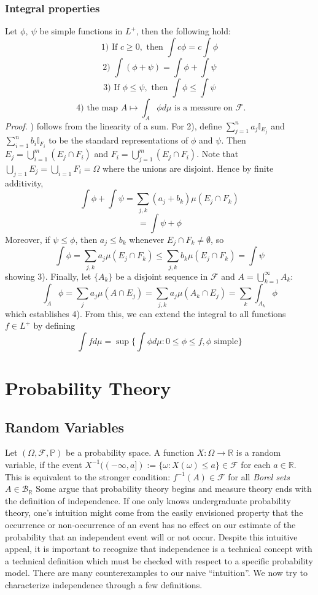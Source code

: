 \documentclass{article}
\begin{document}
\subsubsection{Integral properties}
Let $\phi, \ \psi$ be simple functions in $L^+$, then the following hold:
\[
\text{1) If } c\geq 0, \text{ then } \int c\phi = c\int \phi
\]
\[
\text{2) }\int (\phi+ \psi) = \int \phi+ \int\psi
\]
\[
\text{3) If } \phi \leq \psi, \text{ then } \int \phi \leq \int \psi
\]
\[
\text{ 4) the map } A\mapsto\int_A\phi d\mu \text{ is a measure on } \mathcal{F}.
\]
\textit{Proof.} \newline {}) follows from the linearity of a sum. For 2), define $\sum_{j=1}^na_j\mathbb{I}_{E_j}$ and $\sum_{i=1}^nb_i\mathbb{I}_{F_i}$ to be the standard representations of $\phi$ and $\psi$. 
Then $E_j = \bigcup_{i=1}^m(E_j\cap F_i)$ and $F_i = \bigcup_{j=1}^m(E_j\cap F_i)$. Note that $\bigcup_{j=1}E_j=\bigcup_{i=1}F_i=\Omega$ where the unions are disjoint. Hence by finite additivity, 
\[
\int \phi + \int \psi = \sum_{j,k}(a_j+b_k)\mu(E_j \cap F_k)
\]
\[
=\int \psi + \phi
\]
Moreover, if $\psi \leq \phi$, then $a_j\leq b_k$ whenever $E_j \cap F_k \neq \emptyset $, so 
\[
\int \phi= \sum_{j,k}a_j\mu(E_j\cap F_k) \leq \sum_{j,k}b_k\mu(E_j \cap F_k) = \int \psi
\]
showing 3). Finally, let $\{A_k\}$ be a disjoint sequence in $\mathcal{F}$ and $A= \bigcup_{k=1}^\infty A_k$:
\[
\int_A\phi= \sum_ja_j\mu(A\cap E_j)= \sum_{j,k}a_j\mu(A_k \cap E_j)= \sum_k\int_{A_k}\phi
\]
which establishes 4).\newline \newline
From this, we can extend the integral to all functions $f \in L^+$ by defining 
\[
\int f d\mu = \sup \{ \int \phi d\mu: 0 \leq \phi \leq f, \phi \text{ simple}\}
\]
\section{Probability Theory}
\subsection{Random Variables}
Let $(\Omega,\mathcal{F}, \mathbb{P})$ be a probability space. A function $X:\Omega\to\mathbb{R}$ is a random variable, if the event $X^{-1}((-\infty,a]):=\{\omega:X(\omega)\leq a\}\in\mathcal{F}$ for each $a \in \mathbb{R}$. This is equivalent to the stronger condition: $f^{-1}(A)\in\mathcal{F}$ for all \emph{Borel sets} $A\in\mathcal{B}_\mathbb{R}$  \newline \newline
Some argue that probability theory begins and measure theory ends with the definition of independence. If one only knows undergraduate probability theory, one's intuition might come from the easily envisioned property that the occurrence or non-occurrence of an event has no effect on our estimate of the probability that an independent event will or not occur.
Despite this intuitive appeal, it is important to recognize that independence is a technical concept with a technical definition which must be checked with respect to a specific probability model. There are many counterexamples to our naive ``intuition''. We now try to characterize independence through a few definitions.
\end{document}
